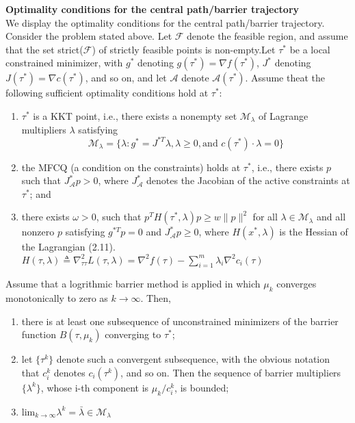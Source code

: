 \documentclass[14pt]{extreport}
\begin{document}
\textbf{Optimality conditions for the central path/barrier trajectory}\\

We display the optimality conditions for the central path/barrier trajectory. Consider the problem stated above.  Let $\mathcal{F}$ denote the feasible region, and assume that the set strict($\mathcal{F}$) of strictly feasible points is non-empty.Let $\tau^*$ be a local constrained minimizer, with $g^*$ denoting $g(\tau^*) = \nabla f(\tau^*)$, $J^*$ denoting $J(\tau^*) = \nabla c(\tau^*)$, and so on, and let $\mathcal{A}$ denote $\mathcal{A}(\tau^*)$. Assume theat the following sufficient optimality conditions hold at $\tau^*$:
\begin{enumerate}[label=(\alph*)]
	\item $\tau^*$ is a KKT point, i.e., there exists a nonempty set $\mathcal{M}_{\lambda}$ of Lagrange multipliers $\lambda$ satisfying 
	$$\mathcal{M}_{\lambda} = \{ \lambda: g^* = J^{*T}\lambda, \lambda \ge 0, \text{and } c(\tau^*)\cdot \lambda = 0 \}$$
	\item the MFCQ (a condition on the constraints) holds at $\tau^*$, i.e., there exists $p$ such that $J^*_{\mathcal{A}}p > 0$, where $J^*_{\mathcal{A}}$ denotes the Jacobian of the active constraints at $\tau^*$; and
	\item there exists $\omega > 0$, such that $p^T H(\tau^*, \lambda)p \ge w \| p\|^2 $ for all $\lambda \in \mathcal{M}_{\lambda}$ and all nonzero $p$ satisfying $g^{*T}p=0$ and $J^*_{\mathcal{A}} p \ge 0$, where $H(x^*, \lambda)$ is the Hessian of the Lagrangian (2.11). $H(\tau, \lambda) \triangleq \nabla^2_{\tau\tau} L(\tau, \lambda) =  \nabla^2 f(\tau) - \sum_{i=1}^{m} \lambda_i \nabla^2 c_i(\tau)$
\end{enumerate}
Assume that a logrithmic barrier method is applied in which $\mu_{k}$ converges monotonically to zero as $k \to \infty$. Then, 
\begin{enumerate}[label=(\roman*)]
	\item there is at least one subsequence of unconstrained minimizers of the barrier function $B(\tau, \mu_k)$ converging to $\tau^*$; 
	\item let $\{ \tau^k\}$ denote such a convergent subsequence, with the obvious notation that $c_i^k$ denotes $c_i(\tau^k)$, and so on. Then the sequence of barrier multipliers $\{ \lambda^{k}\}$, whose i-th component is $\mu_k / c_i^k$, is bounded;
	\item $\text{lim}_{k \to \infty} \lambda^k = \bar{\lambda} \in \mathcal{M}_{\lambda}$
\end{enumerate} 
\end{document}
